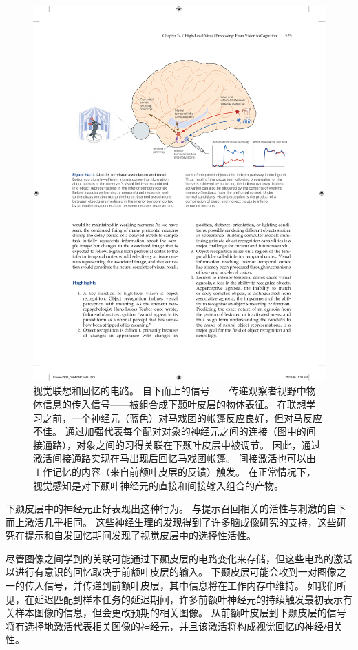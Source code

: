 \begin{figure}[htbp]
	\centering
	\includegraphics[width=0.9\linewidth]{chap24/fig_24_13}
	\caption{视觉联想和回忆的电路。 自下而上的信号——传递观察者视野中物体信息的传入信号——被组合成下颞叶皮层的物体表征。 在联想学习之前，一个神经元（蓝色）对马戏团的帐篷反应良好，但对马反应不佳。 通过加强代表每个配对对象的神经元之间的连接（图中的间接通路），对象之间的习得关联在下颞叶皮层中被调节。 因此，通过激活间接通路实现在马出现后回忆马戏团帐篷。 间接激活也可以由工作记忆的内容（来自前额叶皮层的反馈）触发。 在正常情况下，视觉感知是对下颞叶神经元的直接和间接输入组合的产物。}
	\label{fig:24_13}
\end{figure}

下颞皮层中的神经元正好表现出这种行为。
与提示召回相关的活性与刺激的自下而上激活几乎相同。 
这些神经生理的发现得到了许多脑成像研究的支持，这些研究在提示和自发回忆期间发现了视觉皮层中的选择性活性。


尽管图像之间学到的关联可能通过下颞皮层的电路变化来存储，但这些电路的激活以进行有意识的回忆取决于前额叶皮层的输入。
下颞皮层可能会收到一对图像之一的传入信号，并传递到前额叶皮层，其中信息将在工作内存中维持。
如我们所见，在延迟匹配到样本任务的延迟期间，许多前额叶神经元的持续触发最初表示有关样本图像的信息，但会更改预期的相关图像。
从前额叶皮层到下颞皮层的信号将有选择地激活代表相关图像的神经元，并且该激活将构成视觉回忆的神经相关性。


